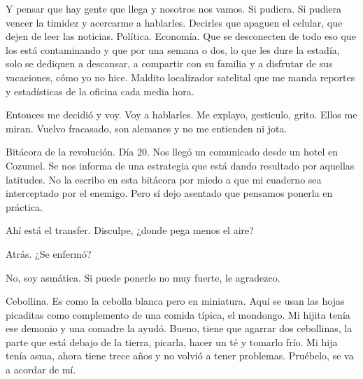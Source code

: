 \documentclass[11pt,twoside,openright,a6paper]{book}
\begin{document}
\vspace{0.5cm}
\hrulefill\hspace{0.2cm} \decofourleft\decofourright \hspace{0.2cm} \hrulefill
\vspace{0.5cm}

Y pensar que hay gente que llega y nosotros
nos vamos. Si pudiera. Si pudiera vencer la timidez y acercarme
a hablarles. Decirles que apaguen el celular, que dejen de leer las
noticias. Política. Economía. Que se desconecten de todo eso que los está
contaminando y que por una semana o dos, lo que les dure la estadía, solo
se dediquen a descansar, a compartir con su familia y a disfrutar de sus
vacaciones, cómo yo no hice. Maldito localizador satelital que me manda
reportes y estadísticas de la oficina cada media hora.

Entonces me decidió y voy. Voy a hablarles. Me explayo, gesticulo,
grito. Ellos me miran. Vuelvo fracasado, son alemanes y no me entienden
ni jota.


\vspace{0.5cm}
\hrulefill\hspace{0.2cm} \decofourleft\decofourright \hspace{0.2cm} \hrulefill
\vspace{0.5cm}

Bitácora de la revolución. Día 20. Nos llegó un comunicado desde un
hotel en Cozumel. Se nos informa de una estrategia que está dando resultado
por aquellas latitudes. No la escribo en esta bitácora por miedo a que
mi cuaderno sea interceptado por el enemigo. Pero sí dejo asentado que
pensamos ponerla en práctica.


\vspace{0.5cm}
\hrulefill\hspace{0.2cm} \decofourleft\decofourright \hspace{0.2cm} \hrulefill
\vspace{0.5cm}

Ahí está el transfer. Disculpe, ¿donde pega menos el aire?

Atrás. ¿Se enfermó?

No, soy asmática. Si puede ponerlo no muy fuerte, le agradezco.

Cebollina. Es como la cebolla blanca pero en miniatura. Aquí se usan las
hojas picaditas como complemento de una comida típica, el mondongo. Mi
hijita tenía ese demonio y una comadre la ayudó. Bueno, tiene que agarrar
dos cebollinas, la parte que está debajo de la tierra, picarla, hacer
un té y tomarlo frío. Mi hija tenía asma, ahora tiene trece años y no
volvió a tener problemas. Pruébelo, se va a acordar de mí.
\end{document}

